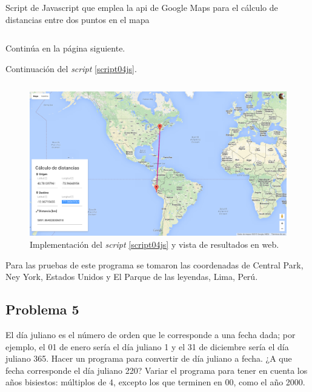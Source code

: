 \documentclass[a4paper,12pt,final]{article}
\begin{document}
      \newpage
      \begin{listing}[H]
        \caption{Script de Javascript que emplea la api de Google Maps para el
        cálculo de distancias entre dos puntos en el mapa}
        \label{script04js}
        \inputminted[lastline=55]{javascript}{./laboratorio_1/problema04.js}
      \end{listing}
      \vspace{-1em}
      \noindent Continúa en la página siguiente.
      \vspace{\fill}

      \newpage
      \noindent\small{Continuación del \emph{script} \ref{script04js}.}
      \vspace{-1em}
      \begin{listing}[H]
        \inputminted[firstline=57]{javascript}{./laboratorio_1/problema04.js}
      \end{listing}
      \vspace{-1em}

      \begin{figure}[H]
        \caption{Implementación del \emph{script} \ref{script04js} y vista de
        resultados en web.}
        \label{script04figure}
        \includegraphics[width=\textwidth]{./laboratorio_1/problema04js_sample.png}
      \end{figure}

      \noindent Para las pruebas de este programa se tomaron las coordenadas de
      Central Park, Ney York, Estados Unidos y El Parque de las leyendas,
      Lima, Perú.
      \vspace{\fill}

  \newpage
  \subsection*{Problema 5}
    \noindent El día juliano es el número de orden que le corresponde a una
    fecha dada; por ejemplo, el 01 de enero sería el día juliano 1 y el 31
    de diciembre sería el día juliano 365. Hacer un programa para
    convertir de día juliano a fecha. ¿A que fecha corresponde el día
    juliano 220? Variar el programa para tener en cuenta los años
    bisiestos: múltiplos de 4, excepto los que terminen en 00, como el
    año 2000.
\end{document}
